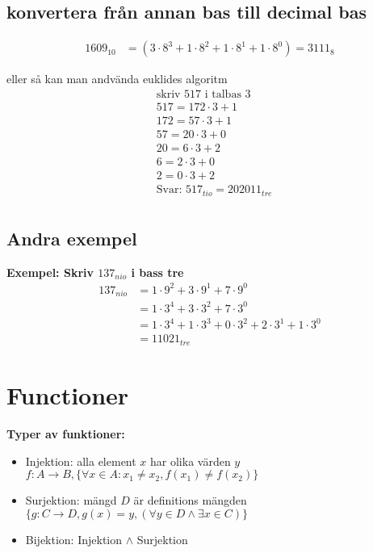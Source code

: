 \begin{multicols}{2}
\subsection{konvertera från annan bas till decimal bas}
\begin{align*}
  1609_{10} &= (3 \cdot 8^3 + 1 \cdot 8^2 + 1 \cdot 8^1 + 1 \cdot 8^0) = 3111_8
\end{align*}

eller så kan man andvända euklides algoritm 
\begin{align*}
  &\text{skriv 517 i talbas 3} \\
  &517 = 172 \cdot 3 + 1 \\
  &172 =  57 \cdot 3 + 1 \\
  & 57 =  20 \cdot 3 + 0 \\
  & 20 =   6 \cdot 3 + 2 \\
  &  6 =   2 \cdot 3 + 0 \\
  &  2 =   0 \cdot 3 + 2 \\
  &\text{Svar: } 517_{tio} = 202011_{tre} \\
\end{align*}


\subsection{Andra exempel}
\textbf{Exempel: Skriv $137_{nio}$  i bass tre}
\begin{align*}
  137_{nio} &= 1 \cdot 9^2 + 3 \cdot 9^1 + 7 \cdot 9^0 \\
  &= 1 \cdot 3^4 + 3 \cdot 3^2 + 7 \cdot 3^0 \\
  &= 1 \cdot 3^4 + 1 \cdot 3^3 + 0 \cdot 3^2 + 2 \cdot 3^1 + 1 \cdot 3^0 \\
  &= 11021_{tre}
\end{align*}


\section{Functioner}
\textbf{Typer av funktioner:}
\begin{itemize}
  \item Injektion: alla element $x$ har olika värden $y$ $f: A \to B, \{{\forall x \in A: x_1 \neq x_2, f(x_1) \neq f(x_2)}\}$
  \item Surjektion: mängd $D$ är definitions mängden  $\{g: C \to D, g(x)=y, (\forall y \in D \land \exists x \in C)\}$
  \item Bijektion: Injektion $\land$ Surjektion
\end{itemize}
 

\end{multicols}
